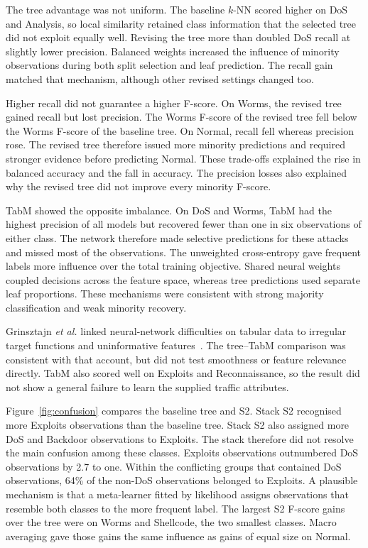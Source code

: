 \documentclass[conference]{IEEEtran}
\newcommand{\knn}{\mbox{$k$-NN}}
\begin{document}
The tree advantage was not uniform. The baseline \knn{} scored higher on DoS and Analysis, so local similarity retained class information that the selected tree did not exploit equally well. Revising the tree more than doubled DoS recall at slightly lower precision. Balanced weights increased the influence of minority observations during both split selection and leaf prediction. The recall gain matched that mechanism, although other revised settings changed too.

Higher recall did not guarantee a higher F-score. On Worms, the revised tree gained recall but lost precision. The Worms F-score of the revised tree fell below the Worms F-score of the baseline tree. On Normal, recall fell whereas precision rose. The revised tree therefore issued more minority predictions and required stronger evidence before predicting Normal. These trade-offs explained the rise in balanced accuracy and the fall in accuracy. The precision losses also explained why the revised tree did not improve every minority F-score.

TabM showed the opposite imbalance. On DoS and Worms, TabM had the highest precision of all models but recovered fewer than one in six observations of either class. The network therefore made selective predictions for these attacks and missed most of the observations. The unweighted cross-entropy gave frequent labels more influence over the total training objective. Shared neural weights coupled decisions across the feature space, whereas tree predictions used separate leaf proportions. These mechanisms were consistent with strong majority classification and weak minority recovery.

Grinsztajn \emph{et al.} linked neural-network difficulties on tabular data to irregular target functions and uninformative features~\cite{grinsztajn2022}. The tree--TabM comparison was consistent with that account, but did not test smoothness or feature relevance directly. TabM also scored well on Exploits and Reconnaissance, so the result did not show a general failure to learn the supplied traffic attributes.

Figure~\ref{fig:confusion} compares the baseline tree and S2. Stack S2 recognised more Exploits observations than the baseline tree. Stack S2 also assigned more DoS and Backdoor observations to Exploits. The stack therefore did not resolve the main confusion among these classes. Exploits observations outnumbered DoS observations by 2.7 to one. Within the conflicting groups that contained DoS observations, 64\% of the non-DoS observations belonged to Exploits. A plausible mechanism is that a meta-learner fitted by likelihood assigns observations that resemble both classes to the more frequent label. The largest S2 F-score gains over the tree were on Worms and Shellcode, the two smallest classes. Macro averaging gave those gains the same influence as gains of equal size on Normal.
\end{document}
